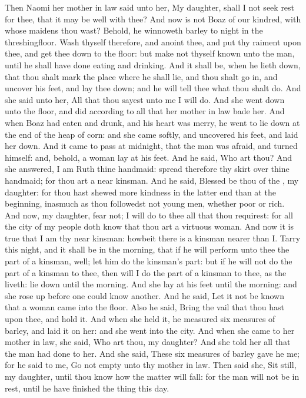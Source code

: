 \begin{biblechapter} %
 Then Naomi her mother in law said unto her, My daughter, shall I not seek rest for thee, that it may be well with thee?
\verse And now is not Boaz of our kindred, with whose maidens thou wast? Behold, he winnoweth barley to night in the threshingfloor.
\verse Wash thyself therefore, and anoint thee, and put thy raiment upon thee, and get thee down to the floor: but make not thyself known unto the man, until he shall have done eating and drinking.
\verse And it shall be, when he lieth down, that thou shalt mark the place where he shall lie, and thou shalt go in, and uncover his feet, and lay thee down; and he will tell thee what thou shalt do.
\verse And she said unto her, All that thou sayest unto me I will do.
\verse And she went down unto the floor, and did according to all that her mother in law bade her.
\verse And when Boaz had eaten and drunk, and his heart was merry, he went to lie down at the end of the heap of corn: and she came softly, and uncovered his feet, and laid her down.
\verse And it came to pass at midnight, that the man was afraid, and turned himself: and, behold, a woman lay at his feet.
\verse And he said, Who art thou? And she answered, I am Ruth thine handmaid: spread therefore thy skirt over thine handmaid; for thou art a near kinsman.
\verse And he said, Blessed be thou of the \LORD, my daughter: for thou hast shewed more kindness in the latter end than at the beginning, inasmuch as thou followedst not young men, whether poor or rich.
\verse And now, my daughter, fear not; I will do to thee all that thou requirest: for all the city of my people doth know that thou art a virtuous woman.
\verse And now it is true that I am thy near kinsman: howbeit there is a kinsman nearer than I.
\verse Tarry this night, and it shall be in the morning, that if he will perform unto thee the part of a kinsman, well; let him do the kinsman's part: but if he will not do the part of a kinsman to thee, then will I do the part of a kinsman to thee, as the \LORD liveth: lie down until the morning.
\verse And she lay at his feet until the morning: and she rose up before one could know another. And he said, Let it not be known that a woman came into the floor.
\verse Also he said, Bring the vail that thou hast upon thee, and hold it. And when she held it, he measured six measures of barley, and laid it on her: and she went into the city.
\verse And when she came to her mother in law, she said, Who art thou, my daughter? And she told her all that the man had done to her.
\verse And she said, These six measures of barley gave he me; for he said to me, Go not empty unto thy mother in law.
\verse Then said she, Sit still, my daughter, until thou know how the matter will fall: for the man will not be in rest, until he have finished the thing this day.
\end{biblechapter}

